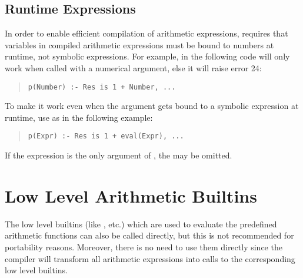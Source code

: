 \subsection{Runtime Expressions}
In order to enable efficient compilation of arithmetic expressions,
{\eclipse} requires that variables in compiled arithmetic expressions
must be bound to numbers at runtime, not symbolic expressions.
For example, in the following code  will only work when called
with a
numerical argument, else it will raise error 24:
\begin{quote}
\begin{verbatim}
p(Number) :- Res is 1 + Number, ...
\end{verbatim}
\end{quote}
To make it work even when the argument gets bound to a symbolic expression
at runtime, use  as in the following example:
\begin{quote}
\begin{verbatim}
p(Expr) :- Res is 1 + eval(Expr), ...
\end{verbatim}
\end{quote}
If the expression is the only argument of , the 
may be omitted.


\section{Low Level Arithmetic Builtins}
The low level builtins (like
,
 etc.)
which are used to evaluate
the predefined arithmetic functions can also be called directly,
but this is not recommended for portability reasons.
Moreover, there is no need to use them directly since the {\eclipse} compiler
will transform all arithmetic expressions into calls to the corresponding
low level builtins.

